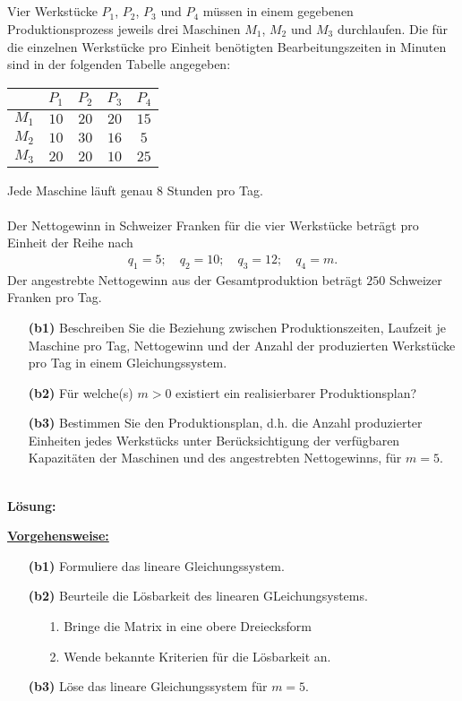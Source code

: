 \subsection*{}
Vier Werkstücke $P_1$, $P_2$, $P_3$ und $P_4$ müssen in einem gegebenen Produktionsprozess jeweils drei Maschinen $M_1$, $M_2$ und $M_3$ durchlaufen.
Die für die einzelnen Werkstücke pro Einheit benötigten Bearbeitungszeiten in Minuten sind in der folgenden Tabelle angegeben: 
\begin{table}[H]
	\centering
	\begin{tabular}{c | c c c c}
		$ $  & $P_1$  &  $P_2$ &  $P_3$ & $P_4$ \\ 
		\hline
		$ M_1 $ & $ 10 $ & $ 20 $ & $ 20 $ & $15$  \\ 
		$ M_2 $ & $ 10 $ & $ 30 $ & $ 16 $ & $5$ \\
		$ M_3 $ & $ 20 $ & $ 20 $ & $ 10 $ & $25$
	\end{tabular}%
\end{table}
Jede Maschine läuft genau $8$ Stunden pro Tag.\\
\\
Der Nettogewinn in Schweizer Franken für die vier Werkstücke beträgt pro Einheit der Reihe nach
\begin{align*}
	q_1 = 5; \quad
	q_2=  10; \quad
	q_3=12; \quad 
	q_4=m.
\end{align*}
Der angestrebte Nettogewinn aus der Gesamtproduktion beträgt $250$ Schweizer Franken pro Tag.
\begin{enumerate}
	\item[\textbf{(b1)}]
	Beschreiben Sie die Beziehung zwischen Produktionszeiten, Laufzeit je Maschine pro Tag, Nettogewinn und der Anzahl der produzierten Werkstücke pro Tag in einem Gleichungssystem.
	
	\item[\textbf{(b2)}] 
	Für welche(s) $m > 0$ existiert ein realisierbarer Produktionsplan?
	\item[\textbf{(b3)}]
	Bestimmen Sie den Produktionsplan, d.h. die Anzahl produzierter Einheiten jedes Werkstücks unter Berücksichtigung der verfügbaren Kapazitäten der Maschinen und des angestrebten Nettogewinns, für $m = 5$.
\end{enumerate}
\ \\
\textbf{Lösung:}
\begin{mdframed}
\underline{\textbf{Vorgehensweise:}}
\renewcommand{\labelenumi}{\theenumi.}
\begin{enumerate}
\item[\textbf{(b1)}] Formuliere das lineare Gleichungssystem.
\item[\textbf{(b2)}] Beurteile die Lösbarkeit des linearen GLeichungsystems.
\begin{enumerate}
	\item[1.] Bringe die Matrix in eine obere Dreiecksform
	\item[2.] Wende bekannte Kriterien für die Lösbarkeit an.
\end{enumerate}
\item[\textbf{(b3)}] Löse das lineare Gleichungssystem für $m = 5$.
\end{enumerate}
\end{mdframed}

